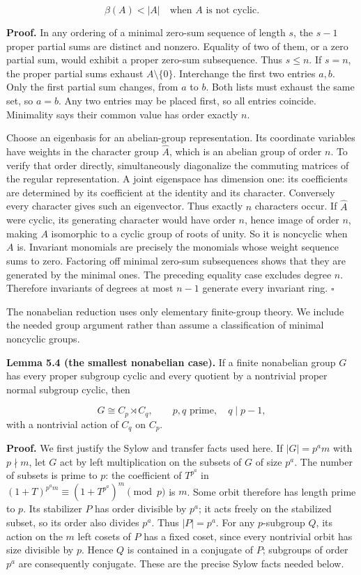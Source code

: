 \documentclass[
]{article}
\begin{document}
\[
\beta(A)<|A|\quad\text{when }A\text{ is not cyclic}.
\tag{S4}
\]

\textbf{Proof.} In any ordering of a minimal zero-sum sequence of length
\(s\), the \(s-1\) proper partial sums are distinct and nonzero.
Equality of two of them, or a zero partial sum, would exhibit a proper
zero-sum subsequence. Thus \(s\leq n\). If \(s=n\), the proper partial
sums exhaust \(A\setminus\{0\}\). Interchange the first two entries
\(a,b\). Only the first partial sum changes, from \(a\) to \(b\). Both
lists must exhaust the same set, so \(a=b\). Any two entries may be
placed first, so all entries coincide. Minimality says their common
value has order exactly \(n\).

Choose an eigenbasis for an abelian-group representation. Its coordinate
variables have weights in the character group \(\widehat A\), which is
an abelian group of order \(n\). To verify that order directly,
simultaneously diagonalize the commuting matrices of the regular
representation. A joint eigenspace has dimension one: its coefficients
are determined by its coefficient at the identity and its character.
Conversely every character gives such an eigenvector. Thus exactly \(n\)
characters occur. If \(\widehat A\) were cyclic, its generating
character would have order \(n\), hence image of order \(n\), making
\(A\) isomorphic to a cyclic group of roots of unity. So it is noncyclic
when \(A\) is. Invariant monomials are precisely the monomials whose
weight sequence sums to zero. Factoring off minimal zero-sum
subsequences shows that they are generated by the minimal ones. The
preceding equality case excludes degree \(n\). Therefore invariants of
degrees at most \(n-1\) generate every invariant ring. \(\square\)

The nonabelian reduction uses only elementary finite-group theory. We
include the needed group argument rather than assume a classification of
minimal noncyclic groups.

\protect{}\label{lemma-5-4}{}

\textbf{Lemma 5.4 (the smallest nonabelian case).} If a finite
nonabelian group \(G\) has every proper subgroup cyclic and every
quotient by a nontrivial proper normal subgroup cyclic, then
\protect{}\label{equation-S5}{}

\[
G\cong C_p\rtimes C_q,
\qquad p,q\text{ prime},\quad q\mid p-1,
\tag{S5}
\] with a nontrivial action of \(C_q\) on \(C_p\).

\textbf{Proof.} We first justify the Sylow and transfer facts used here.
If \(|G|=p^a m\) with \(p\nmid m\), let \(G\) act by left multiplication
on the subsets of \(G\) of size \(p^a\). The number of subsets is prime
to \(p\): the coefficient of \(T^{p^a}\) in
\((1+T)^{p^a m}\equiv(1+T^{p^a})^m\pmod p\) is \(m\). Some orbit
therefore has length prime to \(p\). Its stabilizer \(P\) has order
divisible by \(p^a\); it acts freely on the stabilized subset, so its
order also divides \(p^a\). Thus \(|P|=p^a\). For any \(p\)-subgroup
\(Q\), its action on the \(m\) left cosets of \(P\) has a fixed coset,
since every nontrivial orbit has size divisible by \(p\). Hence \(Q\) is
contained in a conjugate of \(P\); subgroups of order \(p^a\) are
consequently conjugate. These are the precise Sylow facts needed below.
\end{document}
